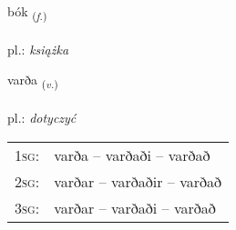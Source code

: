 \documentclass[frontgrid, backgrid]{flacards}\usepackage[]{graphicx}\usepackage[]{xcolor}
\begin{document}
\renewcommand{\blhead}{\vskip5pt {\small\bfseries\footnotesize Nafnorð | Noun }}
\renewcommand{\bcfoot}{\vskip5pt \hspace{2pt}{\small\bfseries\footnotesize 1K}}


{bók \small{\textsubscript{(\textit{f.})}} \\[1ex] %
\textphonetic{[pouːk]} \\
pl.: \emph{książka} \\  [2ex]
\renewcommand*{\arraystretch}{0.8}
}

\renewcommand{\flhead}{\vskip5pt \fboxsep=0pt {\small\bfseries\footnotesize Sagnorð | Verb}}
\renewcommand{\fcfoot}{\vskip5pt \fboxsep=0pt \hspace{2pt}{\small\bfseries\footnotesize 1K}}

\renewcommand{\blhead}{\vskip5pt {\small\bfseries\footnotesize Sagnorð | Verb }}
\renewcommand{\bcfoot}{\vskip5pt \hspace{2pt}{\small\bfseries\footnotesize 1K}}


{varða \small{\textsubscript{(\textit{v.})}} \\[1ex] %
\textphonetic{[varða]} \\
pl.: \emph{dotyczyć} \\  [2ex]
\renewcommand*{\arraystretch}{0.8}
\begin{tabular}{p{1cm}l}
\textsc{1sg}: & varða -- varðaði -- varðað \\ 
\textsc{2sg}: & varðar -- varðaðir -- varðað \\ 
\textsc{3sg}: & varðar -- varðaði -- varðað \\ 
\end{tabular}
}

\end{document}
